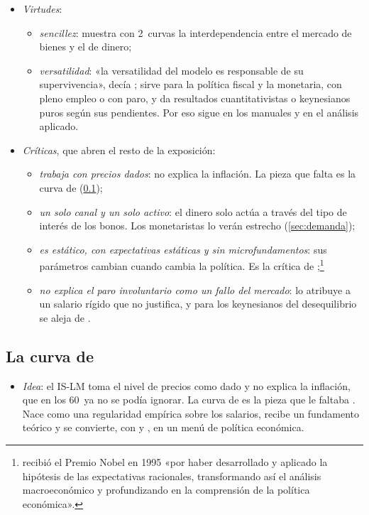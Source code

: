 \documentclass[11pt]{article}
\begin{document}
\begin{itemize}
\item \emph{Virtudes}:
  \begin{itemize}
  \item \emph{sencillez}: muestra con 2~curvas la interdependencia entre el mercado de bienes y el de dinero;
  \item \emph{versatilidad}: «la versatilidad del modelo es responsable de su supervivencia», decía \textcite{Fischer1986Modiglianiesque}; sirve para la política fiscal y la monetaria, con pleno empleo o con paro, y da resultados cuantitativistas o keynesianos puros según sus pendientes. Por eso sigue en los manuales y en el análisis aplicado.
  \end{itemize}
\item \emph{Críticas}, que abren el resto de la exposición:
  \begin{itemize}
  \item \emph{trabaja con precios dados}: no explica la inflación. La pieza que falta es la curva de  (\ref{sec:phillips});
  \item \emph{un solo canal y un solo activo}: el dinero solo actúa a través del tipo de interés de los bonos. Los monetaristas lo verán estrecho (\ref{sec:demanda});
  \item \emph{es estático, con expectativas estáticas y sin microfundamentos}: sus parámetros cambian cuando cambia la política. Es la crítica de \textcite{Lucas1976Econometric} ;\footnote{ recibió el Premio Nobel en 1995 «por haber desarrollado y aplicado la hipótesis de las expectativas racionales, transformando así el análisis macroeconómico y profundizando en la comprensión de la política económica»\nocite{Nobel1995Lucas}.}
  \item \emph{no explica el paro involuntario como un fallo del mercado}: lo atribuye a un salario rígido que no justifica, y para los keynesianos del desequilibrio se aleja de  .
  \end{itemize}
\end{itemize}

\subsection{La curva de }\label{sec:phillips}

\begin{itemize}
\item \emph{Idea}: el IS-LM toma el nivel de precios como dado y no explica la inflación, que en los 60~ya no se podía ignorar. La curva de  es la pieza que le faltaba . Nace como una regularidad empírica sobre los salarios, recibe un fundamento teórico y se convierte, con  y , en un menú de política económica.
\end{itemize}
\end{document}
